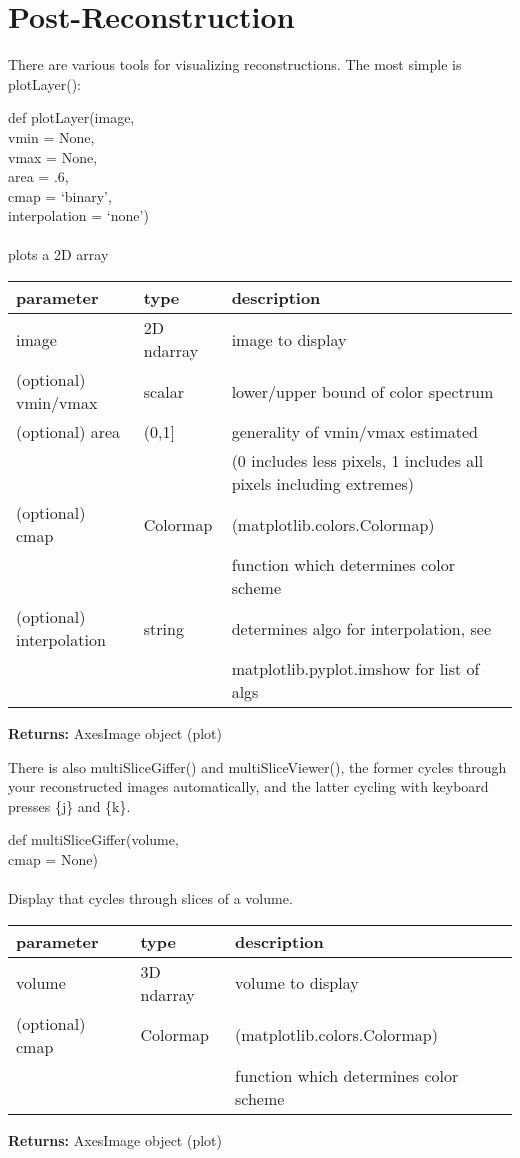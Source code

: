 \documentclass[10pt]{article}
\begin{document}
\section{Post-Reconstruction}
There are various tools for visualizing reconstructions. The most simple is plotLayer():
\begin{center}
    def plotLayer(image,\\ vmin = None,\\ vmax = None,\\ area = .6,\\ cmap = `binary',\\ interpolation = `none')\\
    \ \\ plots a 2D array
\begin{table}[H]
    \centering
    \begin{tabular}{|l|l|l|}
        \hline
        \textbf{parameter} & \textbf{type} &\textbf{description}  \\ \hline
        image &2D ndarray& image to display\\ \hline
        (optional) vmin/vmax & scalar & lower/upper bound of color spectrum \\ \hline
        (optional) area & (0,1] & generality of vmin/vmax estimated \\
        &&(0 includes less pixels, 1 includes all pixels including extremes)\\ \hline
        (optional) cmap & Colormap & (matplotlib.colors.Colormap)\\ && function which determines color scheme \\ \hline
        (optional) interpolation & string &  determines algo for interpolation, see\\
         & & matplotlib.pyplot.imshow for list of algs \\ \hline
    \end{tabular}
\end{table}
\textbf{Returns:} AxesImage object (plot)
\end{center}
There is also multiSliceGiffer() and multiSliceViewer(), the former cycles
through your reconstructed images automatically, and the latter cycling with
keyboard presses \{j\} and \{k\}.
\begin{center} def multiSliceGiffer(volume,\\ cmap = None)\\
\ \\ Display that cycles through slices of a volume.
\begin{table}[H]
    \centering
    \begin{tabular}{|l|l|l|}
        \hline
        \textbf{parameter} & \textbf{type} &\textbf{description}  \\ \hline
        volume&3D ndarray& volume to display\\ \hline
        (optional) cmap & Colormap & (matplotlib.colors.Colormap)\\ && function which determines color scheme \\ \hline
    \end{tabular}
\end{table}
\textbf{Returns:} AxesImage object (plot)\\
\end{center}
\end{document}
